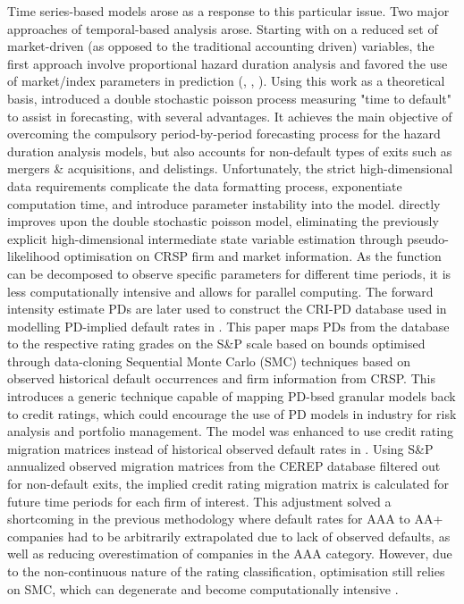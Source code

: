 \documentclass[10pt]{article}
\begin{document}
\begin{multicols*}{2}
Time series-based models arose as a response to this particular issue. Two major approaches of temporal-based analysis arose. Starting with \citep{shumway} on a reduced set of market-driven (as opposed to the traditional accounting driven) variables, the first approach involve proportional hazard duration analysis and favored the use of market/index parameters in prediction (\citep{chava}, \citep{hillegeist}, \citep{hull}).
Using this work as a theoretical basis, \citep{duffie} introduced a double stochastic poisson process measuring "time to default" to assist in forecasting, with several advantages. It achieves the main objective of overcoming the compulsory period-by-period forecasting process for the hazard duration analysis models, but also accounts for non-default types of exits such as mergers \& acquisitions, and delistings. 
Unfortunately, the strict high-dimensional data requirements complicate the data formatting process, exponentiate computation time, and introduce parameter instability into the model. 
\citep{duan2012} directly improves upon the double stochastic poisson model, eliminating the previously explicit high-dimensional intermediate state variable estimation through pseudo-likelihood optimisation on CRSP firm and market information. As the function can be decomposed to observe specific parameters for different time periods, it is less computationally intensive and allows for parallel computing. 
The forward intensity estimate PDs are later used to construct the CRI-PD database used in modelling PD-implied default rates in \citep{duan2021}. This paper maps PDs from the database to the respective rating grades on the S\&P scale based on bounds optimised through data-cloning Sequential Monte Carlo (SMC) techniques \citep{duan2020} based on observed historical default occurrences and firm information from CRSP. 
This introduces a generic technique capable of mapping PD-bsed granular models back to credit ratings, which could encourage the use of PD models in industry for risk analysis and portfolio management. The model was enhanced to use credit rating migration matrices instead of historical observed default rates in \citep{duan2021-2}. Using S\&P annualized observed migration matrices from the CEREP database filtered out for non-default exits, 
the implied credit rating migration matrix is calculated for future time periods for each firm of interest. This adjustment solved a shortcoming in the previous methodology where default rates for AAA to AA+ companies had to be arbitrarily extrapolated due to lack of observed defaults, as well as reducing overestimation of companies in the AAA category. However, due to the non-continuous nature of the rating classification, 
optimisation still relies on SMC, which can degenerate and become computationally intensive \citep{bourgey}.


\end{multicols*}
\end{document}
